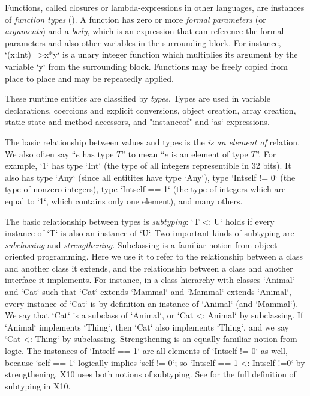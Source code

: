 Functions, called closures or lambda-expressions in other languages, are
instances of {\em function types} (). 
A function has zero or more {\em formal parameters} (or {\em arguments}) and a
{\em body}, which is 
an expression that can reference the formal parameters and also other
variables in the surrounding block. For instance, \xcd`(x:Int)=>x*y`
is a unary integer function which multiplies its argument by the
variable \xcd`y` from the surrounding block.  Functions may be freely
copied from place to place and may be repeatedly applied. 

These runtime entities are classified by {\em types}. Types are used in
variable declarations, coercions and  explicit conversions, object creation,
array creation, static state and method accessors, and
\xcd"instanceof" and \xcd`as` expressions.


The basic relationship between values and types is the {\em is an
element of} relation.  We also often say ``$e$ has type $T$'' to
mean ``$e$ is an element of type $T$''.  For example, \xcd`1` has type
\xcd`Int` (the type of all integers representible in 32 bits). It also
has type \xcd`Any` (since all entitites have type \xcd`Any`), type
\xcd`Int{self != 0}` (the type of nonzero integers), type
\xcd`Int{self == 1}` (the type of integers which are equal to \xcd`1`, which
contains only one element), and many others. 

The basic relationship between types is {\em subtyping}: \xcd`T <: U`
holds if every instance of \xcd`T` is also an instance of \xcd`U`. Two
important kinds of subtyping are {\em subclassing} and {\em
  strengthening}. Subclassing is a familiar notion from
object-oriented programming. Here we use it to refer to the
relationship between a class and another class it extends, and the
relationship between a class and another interface it implements. For
instance, in a class hierarchy with classes \xcd`Animal` and \xcd`Cat`
such that \xcd`Cat` extends \xcd`Mammal` and \xcd`Mammal` extends
\xcd`Animal`, every instance of \xcd`Cat` is by definition an instance
of \xcd`Animal` (and \xcd`Mammal`). We say that \xcd`Cat` is a
subclass of \xcd`Animal`, or \xcd`Cat <: Animal` by subclassing. If
\xcd`Animal` implements \xcd`Thing`, then \xcd`Cat` also implements
\xcd`Thing`, and we say \xcd`Cat <: Thing` by subclassing.
Strengthening is an equally familiar notion from logic.  The instances
of \xcd`Int{self == 1}` are all elements of \xcd`Int{self != 0}` as well,
because \xcd`self == 1` logically implies \xcd`self != 0`; so 
\xcd`Int{self  == 1} <: Int{self !=0}` by strengthening.  X10 uses both notions
of subtyping.  See  for the full definition
of subtyping in X10.

